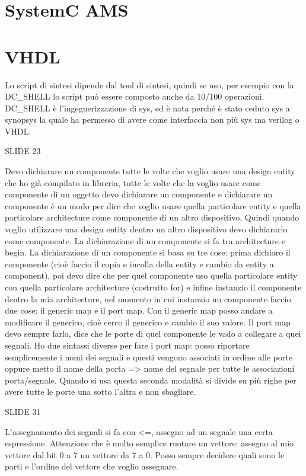 \documentclass[10pt,a4paper,titlepage]{article}
\begin{document}
\section{SystemC AMS}
\section{VHDL}
Lo script di sintesi dipende dal tool di sintesi, quindi se uso, per esempio con la DC\_SHELL  lo script può essere composto anche da 10/100 operazioni. DC\_SHELL è l’ingegnerizzazione di sys, ed è nata perché è stato ceduto sys a synopsys la quale ha permesso di avere come interfaccia non più sys ma verilog o VHDL.

SLIDE 23

Devo dichiarare un componente tutte le volte che voglio usare una design entity che ho già compilato in libreria, tutte le volte che la voglio usare come componente di un oggetto devo dichiarare un componente e dichiarare un componente è un modo per dire che voglio usare quella particolare entity e quella particolare architecture come componente di un altro dispositivo. Quindi quando voglio utilizzare una design entity dentro un altro dispositivo devo dichiararlo come componente. La dichiarazione di un componente si fa tra architecture e begin.
La dichiarazione di un componente si basa su tre cose: prima dichiaro il componente (cioè faccio il copia e incolla della entity e cambio da entity a component), poi devo dire che per quel componente uso quella particolare entity con quella particolare architecture (costrutto for) e infine instanzio il componente dentro la mia architecture, nel momento in cui instanzio un componente faccio due cose: il generic map e il port map. Con il generic map posso andare a modificare il generico, cioè cerco il generico e cambio il suo valore. Il port map devo sempre farlo, dice che le porte di quel componente le vado a collegare a quei segnali. Ho due sintassi diverse per fare i port map: posso riportare semplicemente i nomi dei segnali e questi vengono associati in ordine alle porte oppure metto il nome della porta => nome del segnale per tutte le associazioni porta/segnale. Quando si usa questa seconda modalità si divide su più righe per avere tutte le porte una sotto l’altra e non sbagliare.

SLIDE 31

L’assegnamento dei segnali si fa con <=, assegno ad un segnale una certa espressione. Attenzione che è molto semplice ruotare un vettore: assegno al mio vettore dal bit 0 a 7 un vettore da 7 a 0. Posso sempre decidere quali sono le parti e l’ordine del vettore che voglio assegnare.
\end{document}
